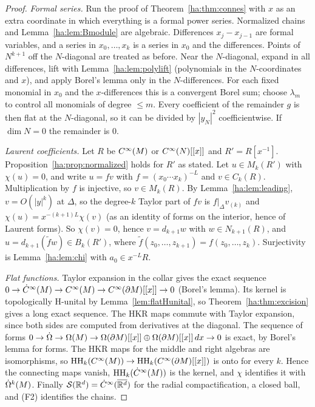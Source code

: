 \begin{proof}
\emph{Formal series.} Run the proof of Theorem~\ref{ha:thm:connes} with
\(x\) as an extra coordinate in which everything is a formal power series.
Normalized chains and Lemma~\ref{ha:lem:Bmodule} are algebraic.
Differences \(x_j-x_{j-1}\) are formal variables, and a series in
\(x_0,\dots,x_k\) is a series in \(x_0\) and the differences. Points of
\(N^{k+1}\) off the \(N\)-diagonal are treated as before. Near the
\(N\)-diagonal, expand in all differences, lift with
Lemma~\ref{ha:lem:polylift} (polynomials in the \(N\)-coordinates and
\(x\)), and apply Borel's lemma only in the \(N\)-differences. For each
fixed monomial in \(x_0\) and the \(x\)-differences this is a convergent
Borel sum; choose \(\lambda_m\) to control all monomials of degree \(\le
m\). Every coefficient of the remainder \(g\) is then flat at the
\(N\)-diagonal, so it can be divided by \(|y_N|^2\) coefficientwise. If
\(\dim N=0\) the remainder is \(0\).

\emph{Laurent coefficients.} Let \(R\) be \(C^\infty(M)\) or \(C^\infty(N)[[x]]\)
and \(R'=R[x^{-1}]\). Proposition~\ref{ha:prop:normalized} holds for
\(R'\) as stated. Let \(u\in M_k(R')\) with \(\chi(u)=0\), and write
\(u=fv\) with \(f=(x_0\cdots x_k)^{-L}\) and \(v\in C_k(R)\). Multiplication
by \(f\) is injective, so \(v\in M_k(R)\). By Lemma~\ref{ha:lem:leading},
\(v=O(|y|^k)\) at \(\Delta\), so the degree-\(k\) Taylor part of \(fv\) is
\(f|_\Delta v_{(k)}\) and \(\chi(u)=x^{-(k+1)L}\chi(v)\) (as an identity of
forms on the interior, hence of Laurent forms). So \(\chi(v)=0\), hence
\(v=d_{k+1}w\) with \(w\in N_{k+1}(R)\), and \(u=d_{k+1}(\tilde fw)\in
B_k(R')\), where \(\tilde f(z_0,\dots,z_{k+1})=f(z_0,\dots,z_k)\).
Surjectivity is Lemma~\ref{ha:lem:chi} with \(a_0\in x^{-L}R\).

\emph{Flat functions.} Taylor expansion in the collar gives the exact
sequence \(0\to\dot C^\infty(M)\to C^\infty(M)\to C^\infty(\partial M)[[x]]\to0\) (Borel's
lemma). Its kernel is topologically H-unital by
Lemma~\ref{lem:flatHunital}, so Theorem~\ref{ha:thm:excision} gives a
long exact sequence. The HKR maps commute with Taylor expansion, since
both sides are computed from derivatives at the diagonal. The sequence of
forms \(0\to\dot\Omega\to\Omega(M)\to\Omega(\partial M)[[x]]\oplus\Omega(\partial M)
[[x]]\,dx\to0\) is exact, by Borel's lemma for forms. The HKR maps for the
middle and right algebras are isomorphisms, so \(\operatorname{HH}_k(C^\infty(M))\to
\operatorname{HH}_k(C^\infty(\partial M)[[x]])\) is onto for every \(k\). Hence the connecting
maps vanish, \(\operatorname{HH}_k(\dot C^\infty(M))\) is the kernel, and \(\chi\) identifies it
with \(\dot\Omega^k(M)\). Finally \(\mathcal S(\mathbb R^d)=\dot C^\infty(\overline{\mathbb R^d})\) for the
radial compactification, a closed ball, and (F2) identifies the chains.
\end{proof}

